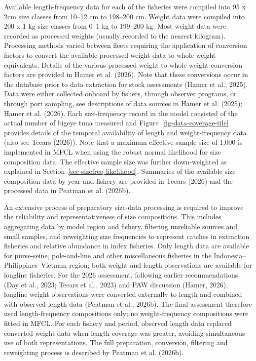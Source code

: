 \documentclass[
  english,
  a4paper,
  a4paper,
  11pt]{SCreport}
\begin{document}
Available length-frequency data for each of the fisheries were compiled
into 95 x 2cm size classes from 10--12 cm to 198--200 cm. Weight data
were compiled into 200 x 1 kg size classes from 0--1 kg to 199--200 kg.
Most weight data were recorded as processed weights (usually recorded to
the nearest kilogram). Processing methods varied between fleets
requiring the application of conversion factors to convert the available
processed weight data to whole weight equivalents. Details of the
various processed weight to whole weight conversion factors are provided
in Hamer et al. (2026). Note that these conversions occur in the
database prior to data extraction for stock assessments (Hamer et al.,
2025). Data were either collected onboard by fishers, through observer
programs, or through port sampling, see descriptions of data sources in
Hamer et al. (2025); Hamer et al. (2026). Each size-frequency record in
the model consisted of the actual number of bigeye tuna measured and
Figure~\ref{fig-data-coverage-tile} provides details of the temporal
availability of length and weight-frequency data (also see Teears
(2026)). Note that a maximum effective sample size of 1,000 is
implemented in MFCL when using the robust normal likelihood for size
composition data. The effective sample size was further down-weighted as
explained in Section~\ref{sec-sizefreq-likelihood}. Summaries of the
available size composition data by year and fishery are provided in
Teears (2026) and the processed data in Peatman et al. (2026b).

An extensive process of preparatory size-data processing is required to
improve the reliability and representativeness of size compositions.
This includes aggregating data by model region and fishery, filtering
unreliable sources and small samples, and reweighting size frequencies
to represent catches in extraction fisheries and relative abundance in
index fisheries. Only length data are available for purse-seine,
pole-and-line and other miscellaneous fisheries in the
Indonesia--Philippines--Vietnam region; both weight and length
observations are available for longline fisheries. For the 2026
assessment, following earlier recommendations (Day et al., 2023; Teears
et al., 2023) and PAW discussion (Hamer, 2026), longline weight
observations were converted externally to length and combined with
observed length data (Peatman et al., 2026b). The final assessment
therefore used length-frequency compositions only; no weight-frequency
compositions were fitted in MFCL. For each fishery and period, observed
length data replaced converted-weight data when length coverage was
greater, avoiding simultaneous use of both representations. The full
preparation, conversion, filtering and reweighting process is described
by Peatman et al. (2026b).
\end{document}
